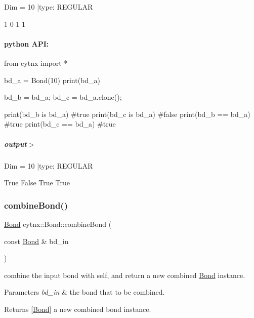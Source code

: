 \begin{DoxyVerbInclude}
Dim = 10 |type: REGULAR 

1
0
1
1
\end{DoxyVerbInclude}
 \paragraph*{python A\+PI\+:}


\begin{DoxyCodeInclude}
\textcolor{keyword}{from} cytnx \textcolor{keyword}{import} *

bd\_a = Bond(10)
print(bd\_a)

bd\_b = bd\_a;
bd\_c = bd\_a.clone();

print(bd\_b \textcolor{keywordflow}{is} bd\_a) \textcolor{comment}{#true}
print(bd\_c \textcolor{keywordflow}{is} bd\_a) \textcolor{comment}{#false}
print(bd\_b == bd\_a) \textcolor{comment}{#true}
print(bd\_c == bd\_a) \textcolor{comment}{#true}
\end{DoxyCodeInclude}
 \subparagraph*{output$>$}


\begin{DoxyVerbInclude}
Dim = 10 |type: REGULAR 


True
False
True
True
\end{DoxyVerbInclude}
 \mbox{\label{classcytnx_1_1Bond_a609c034885efa32fc244be82a56e1f8c}} 
\subsubsection{\texorpdfstring{combine\+Bond()}{combineBond()}}
{\footnotesize\ttfamily \hyperlink{classcytnx_1_1Bond}{Bond} cytnx\+::\+Bond\+::combine\+Bond (\begin{DoxyParamCaption}\item[{const \hyperlink{classcytnx_1_1Bond}{Bond} \&}]{bd\+\_\+in }\end{DoxyParamCaption})\hspace{0.3cm}{\ttfamily [inline]}}



combine the input bond with self, and return a new combined \hyperlink{classcytnx_1_1Bond}{Bond} instance. 


\begin{DoxyParams}{Parameters}
{\em bd\+\_\+in} & the bond that to be combined. \\
\hline
\end{DoxyParams}
\begin{DoxyReturn}{Returns}
\mbox{[}\hyperlink{classcytnx_1_1Bond}{Bond}\mbox{]} a new combined bond instance.
\end{DoxyReturn}
